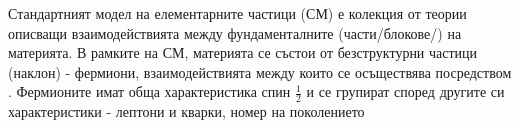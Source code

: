 \par Стандартният модел на елементарните частици (СМ) \cite{PDG,Pich} е колекция от теории описващи взаимодействията между фундаменталните (части/блокове/) на материята. В рамките на СМ, материята се състои от безструктурни частици  (наклон) - фермиони, взаимодействията между които се осъществява посредством . Фермионите имат обща характеристика спин  $\frac{1}{2}$ и се групират според другите си характеристики - лептони и кварки, номер на поколението 
